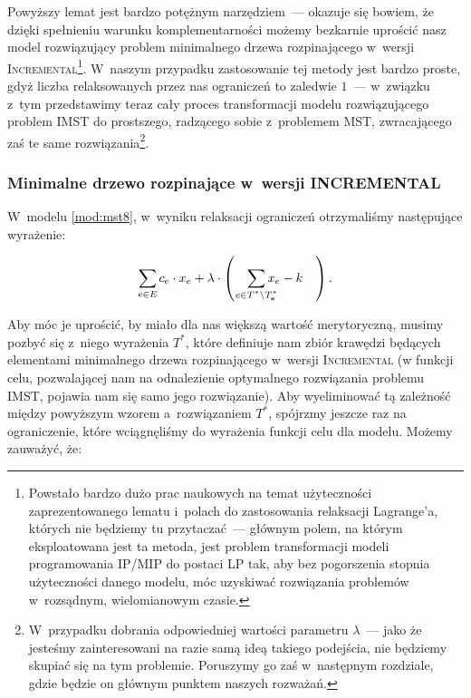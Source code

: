 Powyższy lemat jest bardzo potężnym narzędziem~--- okazuje się bowiem, że dzięki spełnieniu warunku komplementarności możemy bezkarnie uprościć nasz model rozwiązujący problem minimalnego drzewa rozpinającego w~wersji \textsc{Incremental}\footnote{
	Powstało bardzo dużo prac naukowych na temat użyteczności zaprezentowanego lematu i~polach do zastosowania relaksacji Lagrange'a, których nie będziemy tu przytaczać~--- głównym polem, na którym eksploatowana jest ta metoda, jest problem transformacji modeli programowania \textsc{IP}/\textsc{MIP} do postaci \textsc{LP} tak, aby bez pogorszenia stopnia użyteczności danego modelu, móc uzyskiwać rozwiązania problemów w~rozsądnym, wielomianowym czasie.
}.
W~naszym przypadku zastosowanie tej metody jest bardzo proste, gdyż liczba relaksowanych przez nas ograniczeń to zaledwie $1$~--- w~związku z~tym przedstawimy teraz cały proces transformacji modelu rozwiązującego problem \textsc{IMST} do prostszego, radzącego sobie z~problemem \textsc{MST}, zwracającego zaś te same rozwiązania\footnote{
	W~przypadku dobrania odpowiedniej wartości parametru $\lambda$~--- jako że jesteśmy zainteresowani na razie samą ideą takiego podejścia, nie będziemy skupiać się na tym problemie.
	Poruszymy go zaś w~następnym rozdziale, gdzie będzie on głównym punktem naszych rozważań.
}.


\subsubsection{Minimalne drzewo rozpinające w~wersji INCREMENTAL}


W~modelu \ref{mod:mst8}, w~wyniku relaksacji ograniczeń otrzymaliśmy następujące wyrażenie:

\begin{equation}\label{eq:imstrelax}
	\sum_{\mathclap{e \in E}} c_{e} \cdot x_{e} + \lambda \cdot \left( \quad \sum_{\mathclap{e \in T^{\ast} \setminus T^{\ast}_{\textbf{s}}}} x_{e} - k \quad \right)\text{.}
\end{equation}

Aby móc je uprościć, by miało dla nas większą wartość merytoryczną, musimy pozbyć się z~niego wyrażenia $T^{\ast}$, które definiuje nam zbiór krawędzi będących elementami minimalnego drzewa rozpinającego w~wersji \textsc{Incremental} (w funkcji celu, pozwalającej nam na odnalezienie optymalnego rozwiązania problemu \textsc{IMST}, pojawia nam się samo jego rozwiązanie).
Aby wyeliminować tą zależność między powyższym wzorem a~rozwiązaniem $T^{\ast}$, spójrzmy jeszcze raz na ograniczenie, które wciągnęliśmy do wyrażenia funkcji celu dla modelu.
Możemy zauważyć, że:

